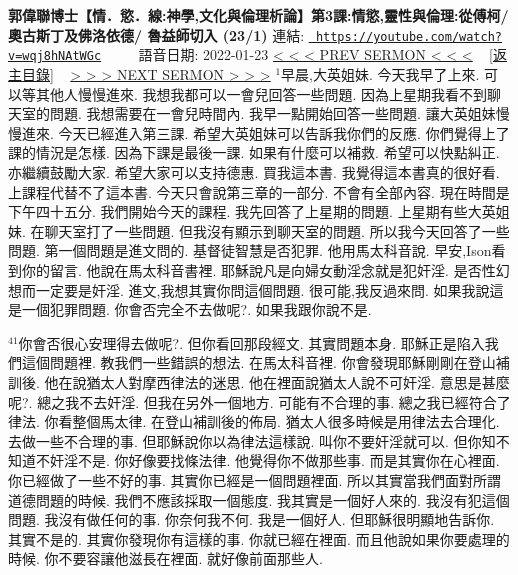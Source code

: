 \documentclass{book}
\begin{document}
\section{}
\label{sec:wqj8hNAtWGc}
\textbf{郭偉聯博士【情．慾．線:神學,文化與倫理析論】第3課:情慾,靈性與倫理:從傅柯/ 奧古斯丁及佛洛依德/ 魯益師切入 (23/1)}
\newline
\newline
連結: \href{https://youtube.com/watch?v=wqj8hNAtWGc}{\texttt{ https://youtube.com/watch?v=wqj8hNAtWGc}} ~~~~ 語音日期: 2022-01-23 
\newline
\newline
\hyperref[sec:KR0XbIoYouc]{\small{< < < PREV SERMON < < <}}
~
\hyperref[sec:index]{\small{[返主目錄]}}
~
\hyperref[sec:hNm147B1MpE]{\small{> > > NEXT SERMON > > >}}
\newline
\newline
$^{1}$早晨,大英姐妹.
今天我早了上來.
可以等其他人慢慢進來.
我想我都可以一會兒回答一些問題.
因為上星期我看不到聊天室的問題.
我想需要在一會兒時間內.
我早一點開始回答一些問題.
讓大英姐妹慢慢進來.
今天已經進入第三課.
希望大英姐妹可以告訴我你們的反應.
你們覺得上了課的情況是怎樣.
因為下課是最後一課.
如果有什麼可以補救.
希望可以快點糾正.
亦繼續鼓勵大家.
希望大家可以支持德惠.
買我這本書.
我覺得這本書真的很好看.
上課程代替不了這本書.
今天只會說第三章的一部分.
不會有全部內容.
現在時間是下午四十五分.
我們開始今天的課程.
我先回答了上星期的問題.
上星期有些大英姐妹.
在聊天室打了一些問題.
但我沒有顯示到聊天室的問題.
所以我今天回答了一些問題.
第一個問題是進文問的.
基督徒智慧是否犯罪.
他用馬太科音說.
早安,Ison看到你的留言.
他說在馬太科音書裡.
耶穌說凡是向婦女動淫念就是犯奸淫.
是否性幻想而一定要是奸淫.
進文,我想其實你問這個問題.
很可能,我反過來問.
如果我說這是一個犯罪問題.
你會否完全不去做呢?.
如果我跟你說不是.

$^{41}$你會否很心安理得去做呢?.
但你看回那段經文.
其實問題本身.
耶穌正是陷入我們這個問題裡.
教我們一些錯誤的想法.
在馬太科音裡.
你會發現耶穌剛剛在登山補訓後.
他在說猶太人對摩西律法的迷思.
他在裡面說猶太人說不可奸淫.
意思是甚麼呢?.
總之我不去奸淫.
但我在另外一個地方.
可能有不合理的事.
總之我已經符合了律法.
你看整個馬太律.
在登山補訓後的佈局.
猶太人很多時候是用律法去合理化.
去做一些不合理的事.
但耶穌說你以為律法這樣說.
叫你不要奸淫就可以.
但你知不知道不奸淫不是.
你好像要找條法律.
他覺得你不做那些事.
而是其實你在心裡面.
你已經做了一些不好的事.
其實你已經是一個問題裡面.
所以其實當我們面對所謂道德問題的時候.
我們不應該採取一個態度.
我其實是一個好人來的.
我沒有犯這個問題.
我沒有做任何的事.
你奈何我不何.
我是一個好人.
但耶穌很明顯地告訴你.
其實不是的.
其實你發現你有這樣的事.
你就已經在裡面.
而且他說如果你要處理的時候.
你不要容讓他滋長在裡面.
就好像前面那些人.
\end{document}
